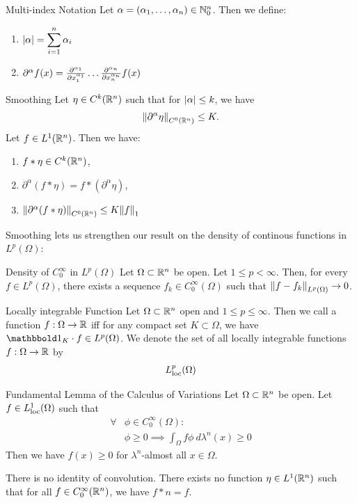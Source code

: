 \begin{importantdefinition}{Multi-index Notation}{}
	Let $\alpha = (\alpha_1, \hdots, \alpha_n) \in \mathbb{N}_0^n$. Then we define:
	\begin{enumerate}
		\item $\displaystyle \abs{\alpha}= \sum_{i = 1}^n \alpha_i$
		\item $\partial^\alpha f(x) = \pdv[\alpha_1]{x_1} \hdots \pdv[\alpha_n]{x_n} f(x)$
	\end{enumerate}
\end{importantdefinition}
\begin{importanttheorem}{Smoothing}{}
	Let $\eta \in C^k(\mathbb{R}^n)$ such that for $\abs{\alpha} \leq k$, we have
	\begin{align*}
		\norm{\partial^\alpha \eta}_{C^0(\mathbb{R}^n)} \leq K.
	\end{align*}
	Let $f \in L^1(\mathbb{R}^n)$. Then we have:
	\begin{enumerate}
		\item $f * \eta \in C^k(\mathbb{R}^n)$,
		\item $\partial^\alpha(f * \eta) = f * (\partial^\alpha \eta)$,
		\item $\norm{\partial^\alpha (f * \eta)}_{C^0(\mathbb{R}^n)} \leq K \norm{f}_1$
	\end{enumerate}
\end{importanttheorem}
Smoothing lets us strengthen our result on the density of continous functions in $L^p(\Omega)$:
\begin{importantcorollary}{Density of $C_0^\infty$ in $L^p(\Omega)$}{}
	Let $\Omega \subset \mathbb{R}^n$ be open. Let $1 \leq p < \infty$. Then, for every $f \in L^p(\Omega)$, there exists a sequence $f_k \in C_0^\infty(\Omega)$ such that $\norm{f - f_k}_{L^p(\Omega)} \to 0$.
\end{importantcorollary}
\begin{importantdefinition}{Locally integrable Function}{}
	Let $\Omega \subset \mathbb{R}^n$ open and $1 \leq p \leq \infty$. Then we call a function $f : \Omega \to \mathbb{R}$  iff for any compact set $K \subset \Omega$, we have $\boldone_K \cdot f \in L^p(\Omega)$. We denote the set of all locally integrable functions $f : \Omega \to \mathbb{R}$ by
	\begin{align*}
		L_{\textnormal{loc}}^p(\Omega)
	\end{align*} 
\end{importantdefinition}
\begin{importantlemma}{Fundamental Lemma of the Calculus of Variations}{}
	Let $\Omega \subset \mathbb{R}^n$ be open. Let $f \in L^1_{\textnormal{loc}}(\Omega)$ such that
	\begin{align*}
		\forall &\phi \in C_0^\infty(\Omega) :\\
		&\phi \geq  0 \implies \int_\Omega f \phi ~d\lambda^n(x) \geq 0
	\end{align*}
	Then we have $f(x) \geq 0$ for $\lambda^n$-almost all $x \in \Omega$.
\end{importantlemma}
\begin{importantcorollary}{There is no identity of convolution.}{}
	There exists no function $\eta \in L^1(\mathbb{R}^n)$ such that for all $f \in C_0^\infty(\mathbb{R}^n)$, we have $f * n = f$.
\end{importantcorollary}